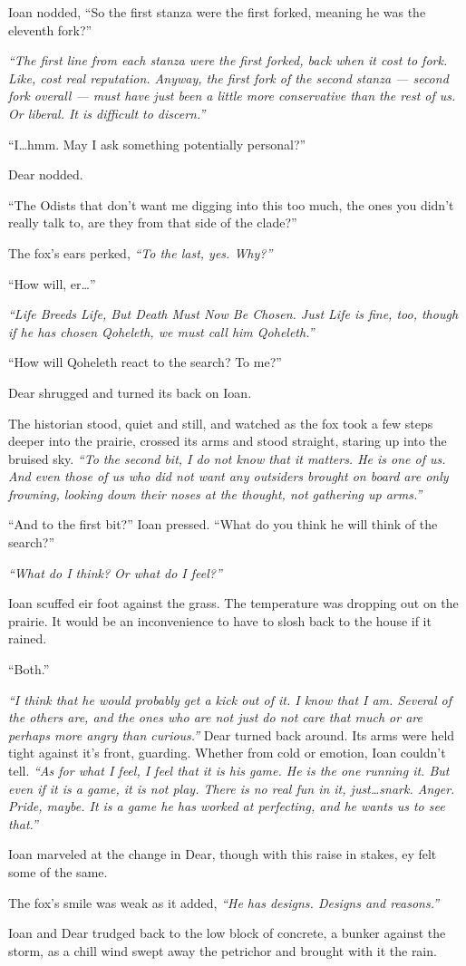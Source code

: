 Ioan nodded, ``So the first stanza were the first forked, meaning he was the eleventh fork?''

\emph{``The first line from each stanza were the first forked, back when it cost to fork. Like, cost real reputation. Anyway, the first fork of the second stanza — second fork overall — must have just been a little more conservative than the rest of us. Or liberal. It is difficult to discern.''}

``I\ldots{}hmm. May I ask something potentially personal?''

Dear nodded.

``The Odists that don't want me digging into this too much, the ones you didn't really talk to, are they from that side of the clade?''

The fox's ears perked, \emph{``To the last, yes. Why?''}

``How will, er\ldots{}''

\emph{``Life Breeds Life, But Death Must Now Be Chosen. Just Life is fine, too, though if he has chosen Qoheleth, we must call him Qoheleth.''}

``How will Qoheleth react to the search? To me?''

Dear shrugged and turned its back on Ioan.

The historian stood, quiet and still, and watched as the fox took a few steps deeper into the prairie, crossed its arms and stood straight, staring up into the bruised sky. \emph{``To the second bit, I do not know that it matters. He is one of us. And even those of us who did not want any outsiders brought on board are only frowning, looking down their noses at the thought, not gathering up arms.''}

``And to the first bit?'' Ioan pressed. ``What do you think he will think of the search?''

\emph{``What do I think? Or what do I feel?''}

Ioan scuffed eir foot against the grass. The temperature was dropping out on the prairie. It would be an inconvenience to have to slosh back to the house if it rained.

``Both.''

\emph{``I think that he would probably get a kick out of it. I know that I am. Several of the others are, and the ones who are not just do not care that much or are perhaps more angry than curious.''} Dear turned back around. Its arms were held tight against it's front, guarding. Whether from cold or emotion, Ioan couldn't tell. \emph{``As for what I feel, I feel that it is his game. He is the one running it. But even if it is a game, it is not play. There is no real fun in it, just\ldots{}snark. Anger. Pride, maybe. It is a game he has worked at perfecting, and he wants us to see that.''}

Ioan marveled at the change in Dear, though with this raise in stakes, ey felt some of the same.

The fox's smile was weak as it added, \emph{``He has designs. Designs and reasons.''}

Ioan and Dear trudged back to the low block of concrete, a bunker against the storm, as a chill wind swept away the petrichor and brought with it the rain.
